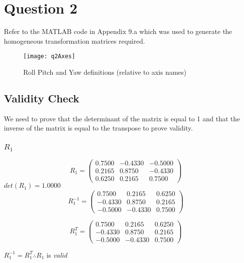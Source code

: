 \section{Question 2}
	Refer to the MATLAB code in Appendix 9.a which was used to generate the homogeneous transformation matrices required.\\

	\begin{figure}[position = here]
		\begin{centering}
		\texttt{[image: q2Axes]}
		\caption[\textit{RPYAxes}]{Roll Pitch and Yaw definitions (relative to axis names)}
		\end{centering}
	\end{figure}
	
	\subsection{Validity Check}
	We need to prove that the determinant of the matrix is equal to 1 and that the inverse of the matrix is equal to the transpose to prove validity.
		\subsubsection{$R_{1}$}
			$$
			R_{1} =
			\begin{pmatrix}
				0.7500 & -0.4330 & -0.5000\\
				0.2165 & 0.8750 & -0.4330\\
				0.6250  & 0.2165  & 0.7500
			\end{pmatrix}
			$$
			\hspace{35mm}$det(R_{1}) = 1.0000$
			\\
			$$
			R_{1}^{-1} =
			\begin{pmatrix}
				0.7500 & 0.2165 & 0.6250\\
				-0.4330 & 0.8750 & 0.2165\\
				-0.5000  & -0.4330  & 0.7500
			\end{pmatrix}
			$$
			
			$$
			R_{1}^{T} =
			\begin{pmatrix}
				0.7500 & 0.2165 & 0.6250\\
				-0.4330 & 0.8750 & 0.2165\\
				-0.5000  & -0.4330  & 0.7500
			\end{pmatrix}
			$$
			
			\hspace{30mm}$R_{1}^{-1} = R_{1}^{T}\therefore R_{1}$ is \emph{valid}
			
